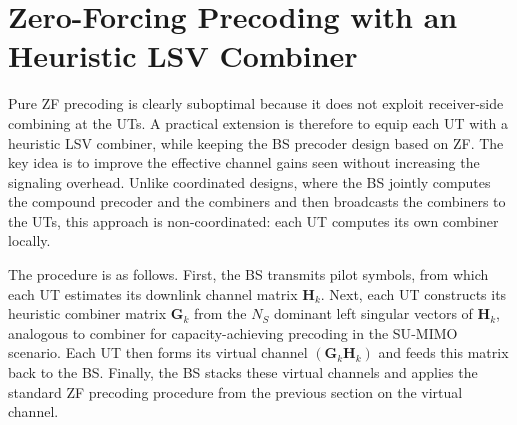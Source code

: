 \section{Zero-Forcing Precoding with an Heuristic LSV Combiner}
\label{section:mu_mimo_zf_lsv_precoding}

Pure \ac{ZF} precoding is clearly suboptimal because it does not exploit receiver-side combining at the \acp{UT}.
A practical extension is therefore to equip each \ac{UT} with a heuristic \acf{LSV} combiner, while keeping the \ac{BS} precoder design based on \ac{ZF}.
The key idea is to improve the effective channel gains seen without increasing the signaling overhead.
Unlike coordinated designs, where the \ac{BS} jointly computes the compound precoder and the combiners and then broadcasts the combiners to the \acp{UT}, this approach is non-coordinated: each \ac{UT} computes its own combiner locally.

The procedure is as follows.
First, the \ac{BS} transmits pilot symbols, from which each \ac{UT} estimates its downlink channel matrix $\mathbf{H}_k$.
Next, each \ac{UT} constructs its heuristic combiner matrix $\mathbf{G}_k$ from the $N_S$ dominant left singular vectors of $\mathbf{H}_k$, analogous to combiner for capacity-achieving precoding in the \ac{SU}-\ac{MIMO} scenario.
Each \ac{UT} then forms its virtual channel $(\mathbf{G}_k \mathbf{H}_k)$ and feeds this matrix back to the \ac{BS}.
Finally, the \ac{BS} stacks these virtual channels and applies the standard \ac{ZF} precoding procedure from the previous section on the virtual channel.

